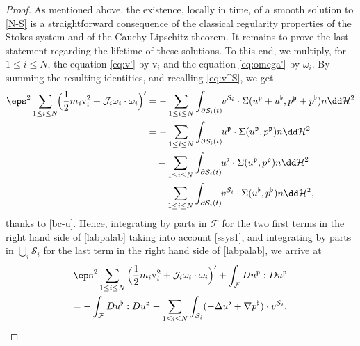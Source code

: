\begin{proof}
As mentioned above, the existence, locally in time, of a smooth solution to \eqref{N-S} is a straightforward consequence of the classical regularity properties of the Stokes system and of the Cauchy-Lipschitz theorem. It remains to prove
the last statement regarding the lifetime of these solutions.
To this end, we multiply, for $ 1\leq i \leq N$,
the equation \eqref{eq:v'} by
$\textrm{v}_i $ and the equation
\eqref{eq:omega'} by $\omega_i$.
By summing the resulting identities, and recalling \eqref{eq:v^S}, we get
\begin{equation}
\begin{aligned}
\eps^2 \sum_{1\leq i \leq N}\hspace*{-1mm} \Big(\frac12 m_i \textrm{v}_i^2
+ \mathcal{J}_i \omega_i \cdot \omega_i \Big)'
&=- \sum_{1\leq i \leq N} \int_{\partial \mathcal S_i (t)}\hspace*{-1mm} v^{{\mathcal S}_i}
\cdot \Sigma(u^\mathfrak{p} + u^\flat,p^\mathfrak{p} + p^\flat) n \dd\mathcal{H}^2
\\
&=- \sum_{1\leq i \leq N} \int_{\partial \mathcal S_i (t)}\hspace*{-1mm} u^\mathfrak{p}
\cdot \Sigma(u^\mathfrak{p},p^\mathfrak{p}) n \dd\mathcal{H}^2 \\
&\quad - \sum_{1\leq i \leq N} \int_{\partial \mathcal S_i (t)}\hspace*{-1mm} u^\flat
\cdot \Sigma(u^\mathfrak{p},p^\mathfrak{p}) n \dd\mathcal{H}^2
\\ &\quad - \sum_{1\leq i \leq N} \int_{\partial \mathcal S_i (t)}\hspace*{-1mm} v^{{\mathcal S}_i}
\cdot \Sigma(u^\flat,p^\flat) n \dd\mathcal{H}^2,
\label{labpalab}
\end{aligned}
\end{equation}
thanks to \eqref{bc-u}.
Hence, integrating by parts
in ${\mathcal F}$ for the two first terms in the right hand side of \eqref{labpalab}
taking into account \eqref{ssys1}, and integrating by parts in $\bigcup_i {\mathcal S}_i$ for the last term in the right hand side of \eqref{labpalab}, we arrive at
\begin{multline} \label{nrj}
\eps^2 \sum_{1\leq i \leq N} \Big(\frac12 m_i \textrm{v}_i^2
+ \mathcal{J}_i \omega_i \cdot \omega_i \Big)' + \int_{\mathcal F} D u^\mathfrak{p} : D u^\mathfrak{p}\\
=- \int_{\mathcal F} D u^\flat : D u^\mathfrak{p}
- \sum_{1 \leq i \leq N} \int_{\mathcal S_i} (-\Delta u^\flat + \nabla p^\flat) \cdot v^{{\mathcal S}_i}.

\end{multline}
\end{proof}
